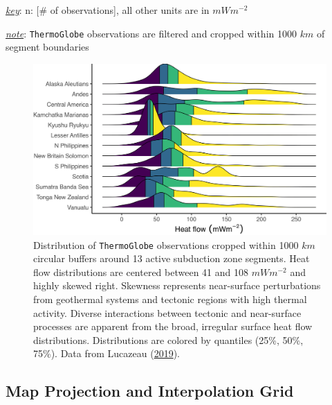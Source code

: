 \begin{table}
\begin{threeparttable}
\begin{tabular}[t]{lrrrrrrr}
\bottomrule
\end{tabular}
\begin{tablenotes}
\item \uline{\textit{key}}: n: [\# of observations], all other units are in $mWm^{-2}$
\item \uline{\textit{note}}: \texttt{ThermoGlobe} observations are filtered and cropped within 1000 $km$ of segment boundaries
\end{tablenotes}
\end{threeparttable}
\end{table}

\begin{figure}[htbp]

{\centering \includegraphics[width=1\linewidth,]{assets/figs/chpt3/hfSummary} 

}

\caption[Distributions of \texttt{ThermoGlobe} observations near 13 active subduction zone segments]{Distribution of \texttt{ThermoGlobe} observations cropped within 1000 \(km\) circular buffers around 13 active subduction zone segments. Heat flow distributions are centered between 41 and 108 \(mWm^{-2}\) and highly skewed right. Skewness represents near-surface perturbations from geothermal systems and tectonic regions with high thermal activity. Diverse interactions between tectonic and near-surface processes are apparent from the broad, irregular surface heat flow distributions. Distributions are colored by quantiles (25\%, 50\%, 75\%). Data from Lucazeau (\protect\hyperlink{ref-lucazeau2019}{2019}).}\label{fig:hfSummaryPlot}
\end{figure}

\hypertarget{map-projection-and-interpolation-grid}{%
\subsection{Map Projection and Interpolation Grid}\label{map-projection-and-interpolation-grid}}

